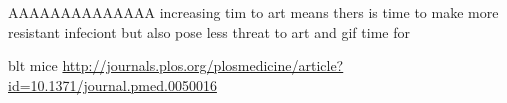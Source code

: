 \documentclass[DIV=15]{scrartcl}
\begin{document}
 
 
 
 AAAAAAAAAAAAAA
   increasing tim to art means thers is time to make more resistant infeciont but also pose less threat to art and gif time for 
   
   
   blt mice \url{http://journals.plos.org/plosmedicine/article?id=10.1371/journal.pmed.0050016}
 

 


 
\end{document}
